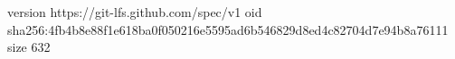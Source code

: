 version https://git-lfs.github.com/spec/v1
oid sha256:4fb4b8e88f1e618ba0f050216e5595ad6b546829d8ed4c82704d7e94b8a76111
size 632
